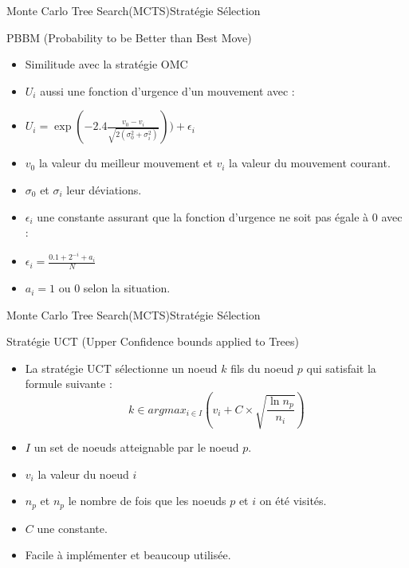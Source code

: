 \begin{frame}{Monte Carlo Tree Search(MCTS)}{Stratégie Sélection}
	\begin{block}{PBBM (Probability to be Better than Best Move)}
		\begin{itemize}
			\item Similitude avec la stratégie OMC
			\item $U_{i}$ aussi une fonction d'urgence d'un mouvement avec :
			\item $U_{i} = \exp(-2.4\frac{v_{0} - v_{i}}{\sqrt{2(\sigma_{0}^2 + \sigma_{i}^2)}})) + \epsilon_{i}$
			\item $v_{0}$ la valeur du meilleur mouvement et $v_{i}$ la valeur du mouvement courant.
			\item $\sigma_{0}$ et $\sigma_{i}$ leur déviations.
			\item $\epsilon_ {i}$ une constante assurant que la fonction d'urgence ne soit pas égale à 0 avec :
			\item $\epsilon_ {i} = \frac{0.1 + 2^{-i} + a_{i}}{N}$
			\item $a_{i} = 1$ ou $0$ selon la situation.
		\end{itemize}
	\end{block}
\end{frame}

\begin{frame}{Monte Carlo Tree Search(MCTS)}{Stratégie Sélection}
	\begin{block}{Stratégie UCT (Upper Confidence bounds applied to Trees)}
		\begin{itemize}
			\item La stratégie UCT sélectionne un noeud $k$ fils du noeud $p$ qui satisfait la formule suivante :
			      $$k \in argmax_{i\in I}(v_{i} + C \times \sqrt{\frac{\ln n_{p}}{n_{i}}})$$
			\item $I$ un set de noeuds atteignable par le noeud $p$.
			\item $v_{i}$ la valeur du noeud $i$
			\item $n_{p}$ et $n_{p}$ le nombre de fois que les noeuds $p$ et $i$ on été visités.
			\item $C$ une constante.
			\item Facile à implémenter et beaucoup utilisée.
		\end{itemize}
	\end{block}
\end{frame}

